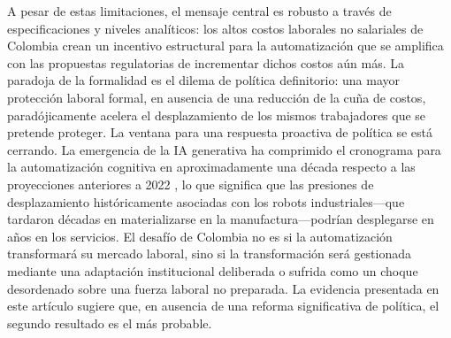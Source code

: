 \documentclass{article}
\begin{document}
A pesar de estas limitaciones, el mensaje central es robusto a trav\'es de especificaciones y niveles anal\'iticos: los altos costos laborales no salariales de Colombia crean un incentivo estructural para la automatizaci\'on que se amplifica con las propuestas regulatorias de incrementar dichos costos a\'un m\'as. La paradoja de la formalidad es el dilema de pol\'itica definitorio: una mayor protecci\'on laboral formal, en ausencia de una reducci\'on de la cu\~na de costos, parad\'ojicamente acelera el desplazamiento de los mismos trabajadores que se pretende proteger. La ventana para una respuesta proactiva de pol\'itica se est\'a cerrando. La emergencia de la IA generativa ha comprimido el cronograma para la automatizaci\'on cognitiva en aproximadamente una d\'ecada respecto a las proyecciones anteriores a 2022 \cite{wef2025}, lo que significa que las presiones de desplazamiento hist\'oricamente asociadas con los robots industriales---que tardaron d\'ecadas en materializarse en la manufactura---podr\'ian desplegarse en a\~nos en los servicios. El desaf\'io de Colombia no es si la automatizaci\'on transformar\'a su mercado laboral, sino si la transformaci\'on ser\'a gestionada mediante una adaptaci\'on institucional deliberada o sufrida como un choque desordenado sobre una fuerza laboral no preparada. La evidencia presentada en este art\'iculo sugiere que, en ausencia de una reforma significativa de pol\'itica, el segundo resultado es el m\'as probable.


% 
\end{document}

